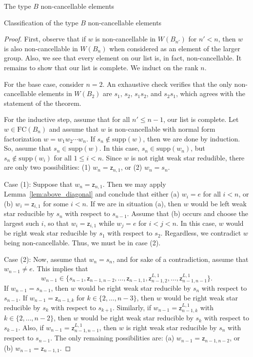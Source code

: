 \documentclass[12pt]{amsart}
\newcommand{\z}{\mathsf{z}}
\newcommand{\supp}{\mathrm{supp}}
\renewcommand{\(}{\left(}
\renewcommand{\)}{\right)}
\newcommand{\FC}{\mathrm{FC}}
\begin{document}
\begin{section}{The type $B$ non-cancellable elements}
\begin{subsection}{Classification of the type $B$ non-cancellable elements}
\begin{proof}
First, observe that if $w$ is non-cancellable in $W(B_{n'})$ for $n' < n$, then $w$ is also non-cancellable in $W(B_{n})$ when considered as an element of the larger group.  Also, we see that every element on our list is, in fact, non-cancellable.  It remains to show that our list is complete. We induct on the rank $n$.  

For the base case, consider $n=2$.  An exhaustive check verifies that the only non-cancellable elements in $W(B_{2})$ are $s_{1}$, $s_{2}$, $s_{1}s_{2}$, and $s_{2}s_{1}$, which agrees with the statement of the theorem.  

For the inductive step, assume that for all $n' \leq n-1$, our list is complete.  Let $w \in \FC(B_{n})$ and assume that $w$ is non-cancellable with normal form factorization $w=w_{1}w_{2}\cdots w_{n}$.  If $s_{n}\notin \supp(w)$, then we are done by induction.  So, assume that $s_{n}\in \supp(w)$.  In this case, $s_{n}\in\supp(w_{n})$, but $s_{n}\notin \supp(w_{i})$ for all $1\leq i <n$.  Since $w$ is not right weak star redudible, there are only two possibilities: (1) $w_n=\z_{n,1}$, or (2) $w_{n}=s_{n}$.  

Case (1): Suppose that $w_{n}=\z_{n,1}$.  Then we may apply Lemma~\ref{lem:above_diagonal} and conclude that either (a) $w_{i}=e$ for all $i<n$, or (b) $w_{i}=\z_{i,1}$ for some $i<n$.  If we are in situation (a), then $w$ would be left weak star reducible by $s_{n}$ with respect to $s_{n-1}$.  Assume that (b) occurs and choose the largest such $i$, so that $w_{i}=\z_{i,1}$ while $w_{j}=e$ for $i<j<n$.  In this case, $w$ would be right weak star reducible by $s_{1}$ with respect to $s_{2}$.  Regardless, we contradict $w$ being non-cancellable.  Thus, we must be in case (2).

Case (2):  Now, assume that $w_{n}=s_{n}$, and for sake of a contradiction, assume that $w_{n-1}\neq e$.  This implies that
\[
w_{n-1}\in \{s_{n-1},\z_{n-1,n-2},\ldots,\z_{n-1,1},\z_{n-1,2}^{L,1},\ldots,\z_{n-1,n-1}^{L,1}\}.
\]
If $w_{n-1}=s_{n-1}$, then $w$ would be right weak star reducible by $s_{n}$ with respect to $s_{n-1}$.  If $w_{n-1}=\z_{n-1,k}$ for $k\in \{2,\ldots,n-3\}$, then $w$ would be right weak star reducible by $s_{k}$ with respect to $s_{k+1}$.  Similarly, if $w_{n-1}=\z_{n-1,k}^{L,1}$ with $k\in \{2,\ldots,n-2\}$, then $w$ would be right weak star reducible by $s_{k}$ with respect to $s_{k-1}$.  Also, if $w_{n-1}=\z_{n-1,n-1}^{L,1}$, then $w$ is right weak star reducible by $s_{n}$ with respect to $s_{n-1}$.  The only remaining possibilities are: (a) $w_{n-1}=\z_{n-1,n-2}$, or (b) $w_{n-1}=\z_{n-1,1}$.


\end{proof}
\end{subsection}
\end{section}
\end{document}
